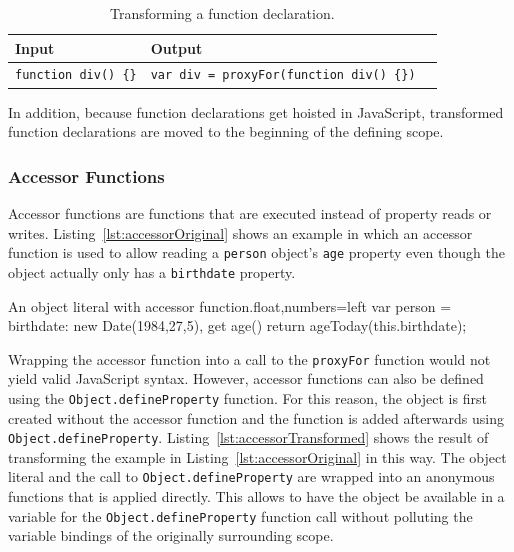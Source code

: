 \begin{table}[h]
\begin{center}
\begin{tabular}{| l | l | l |}
\hline
Input & Output \\ \hline
\lstinline|function div() {}| & \lstinline|var div = proxyFor(function div() {})| \\ \hline
\end{tabular}
\end{center}
\caption[Table caption text]{Transforming a function declaration.}
\label{table:funcTransform}
\end{table}

In addition, because function declarations get hoisted in JavaScript, transformed function declarations are moved to the beginning of the defining scope.


\subsubsection{Accessor Functions}

Accessor functions are functions that are executed instead of property reads or writes.
Listing~\ref{lst:accessorOriginal} shows an example in which an accessor function is used to allow reading a \lstinline{person} object's \lstinline{age} property even though the object actually only has a \lstinline{birthdate} property.

\begin{code}{An object literal with accessor function.}{float,numbers=left}
var person = {
    birthdate: new Date(1984,27,5),
    get age() {
        return ageToday(this.birthdate);
    }
}
\end{code}
\iffalse
\end{verbatim}\fi

Wrapping the accessor function into a call to the \lstinline{proxyFor} function would not yield valid JavaScript syntax.
However, accessor functions can also be defined using the \lstinline{Object.defineProperty} function.
For this reason, the object is first created without the accessor function and the function is added afterwards using \lstinline{Object.defineProperty}.
Listing~\ref{lst:accessorTransformed} shows the result of transforming the example in Listing~\ref{lst:accessorOriginal} in this way.
The object literal and the call to \lstinline{Object.defineProperty} are wrapped into an anonymous functions that is applied directly.
This allows to have the object be available in a variable for the \lstinline{Object.defineProperty} function call without polluting the variable bindings of the originally surrounding scope.


